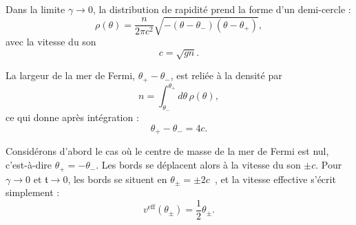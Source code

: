 Dans la limite $\gamma \to 0$, la distribution de rapidité prend la forme d’un demi-cercle \cite{LL_1963_1} :
\begin{equation}
	\rho(\theta) = \frac{n}{2 \pi c^2} \sqrt{-(\theta - \theta_-)(\theta - \theta_+)} ,
\end{equation}
avec la vitesse du son
\begin{equation}
	c = \sqrt{g n}.
\end{equation}

La largeur de la mer de Fermi, $\theta_+ - \theta_-$, est reliée à la densité par 
\begin{equation}
	n = \int_{\theta_-}^{\theta_+} d\theta \, \rho(\theta),
\end{equation}
ce qui donne après intégration :
\begin{equation}
	\theta_+ - \theta_- = 4 c.
\end{equation}



%

Considérons d’abord le cas où le centre de masse de la mer de Fermi est nul, c’est-à-dire $\theta_+ = -\theta_-$. Les bords se déplacent alors à la vitesse du son $\pm c$. Pour $\gamma \to 0$ et $\mathfrak{t} \to 0$, les bords se situent en $\theta_\pm = \pm 2c$~\cite{LL_1963_1}, et la vitesse effective s’écrit simplement :
\begin{equation}
v^{\mathrm{eff}}(\theta_\pm) = \frac{1}{2}\theta_\pm.
\end{equation}

